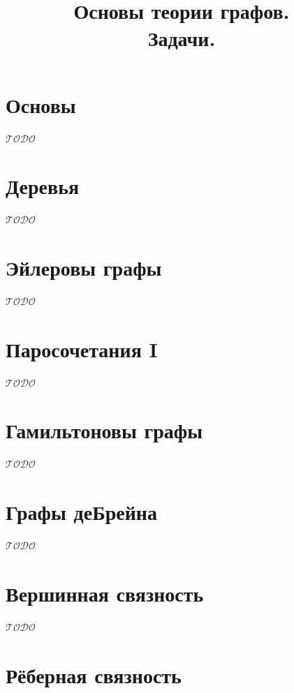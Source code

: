 \documentclass[a4paper,12pt]{article}
\title{Основы теории графов. \\ Задачи.}
\author{}
\date{}
\theoremstyle{remark}
\def\iiTODO{\guillemotleft$\mathcal{TODO}$\guillemotright\textellipsis}
\begin{document}
\maketitle



\section{Основы}

\iiTODO



\section{Деревья}

\iiTODO



\section{Эйлеровы графы}

\iiTODO



\section{Паросочетания I}

\iiTODO



\section{Гамильтоновы графы}

\iiTODO



\section{Графы деБрейна}

\iiTODO



\section{Вершинная связность}

\iiTODO




\section{Рёберная связность}
\end{document}
